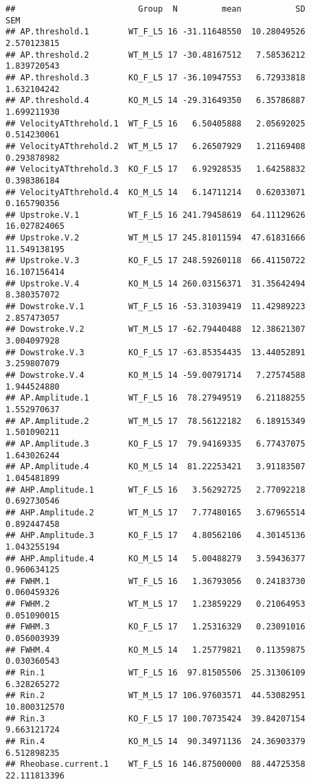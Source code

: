 \documentclass[
]{article}
\begin{document}
\begin{verbatim}
##                         Group  N         mean           SD          SEM
## AP.threshold.1        WT_F_L5 16 -31.11648550  10.28049526  2.570123815
## AP.threshold.2        WT_M_L5 17 -30.48167512   7.58536212  1.839720543
## AP.threshold.3        KO_F_L5 17 -36.10947553   6.72933818  1.632104242
## AP.threshold.4        KO_M_L5 14 -29.31649350   6.35786887  1.699211930
## VelocityATthrehold.1  WT_F_L5 16   6.50405888   2.05692025  0.514230061
## VelocityATthrehold.2  WT_M_L5 17   6.26507929   1.21169408  0.293878982
## VelocityATthrehold.3  KO_F_L5 17   6.92928535   1.64258832  0.398386184
## VelocityATthrehold.4  KO_M_L5 14   6.14711214   0.62033071  0.165790356
## Upstroke.V.1          WT_F_L5 16 241.79458619  64.11129626 16.027824065
## Upstroke.V.2          WT_M_L5 17 245.81011594  47.61831666 11.549138195
## Upstroke.V.3          KO_F_L5 17 248.59260118  66.41150722 16.107156414
## Upstroke.V.4          KO_M_L5 14 260.03156371  31.35642494  8.380357072
## Dowstroke.V.1         WT_F_L5 16 -53.31039419  11.42989223  2.857473057
## Dowstroke.V.2         WT_M_L5 17 -62.79440488  12.38621307  3.004097928
## Dowstroke.V.3         KO_F_L5 17 -63.85354435  13.44052891  3.259807079
## Dowstroke.V.4         KO_M_L5 14 -59.00791714   7.27574588  1.944524880
## AP.Amplitude.1        WT_F_L5 16  78.27949519   6.21188255  1.552970637
## AP.Amplitude.2        WT_M_L5 17  78.56122182   6.18915349  1.501090211
## AP.Amplitude.3        KO_F_L5 17  79.94169335   6.77437075  1.643026244
## AP.Amplitude.4        KO_M_L5 14  81.22253421   3.91183507  1.045481899
## AHP.Amplitude.1       WT_F_L5 16   3.56292725   2.77092218  0.692730546
## AHP.Amplitude.2       WT_M_L5 17   7.77480165   3.67965514  0.892447458
## AHP.Amplitude.3       KO_F_L5 17   4.80562106   4.30145136  1.043255194
## AHP.Amplitude.4       KO_M_L5 14   5.00488279   3.59436377  0.960634125
## FWHM.1                WT_F_L5 16   1.36793056   0.24183730  0.060459326
## FWHM.2                WT_M_L5 17   1.23859229   0.21064953  0.051090015
## FWHM.3                KO_F_L5 17   1.25316329   0.23091016  0.056003939
## FWHM.4                KO_M_L5 14   1.25779821   0.11359875  0.030360543
## Rin.1                 WT_F_L5 16  97.81505506  25.31306109  6.328265272
## Rin.2                 WT_M_L5 17 106.97603571  44.53082951 10.800312570
## Rin.3                 KO_F_L5 17 100.70735424  39.84207154  9.663121724
## Rin.4                 KO_M_L5 14  90.34971136  24.36903379  6.512898235
## Rheobase.current.1    WT_F_L5 16 146.87500000  88.44725358 22.111813396

\end{verbatim}
\end{document}
